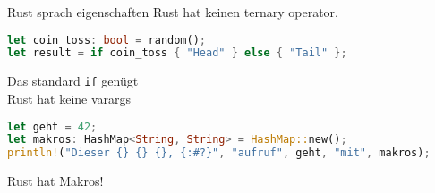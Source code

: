 \begin{frame}[fragile]{Rust sprach eigenschaften}
    Rust hat keinen ternary operator.
    \pause
    \begin{lstlisting}[language=Rust,escapechar=@,label={lst:ternary}]
let coin_toss: bool = random();
let result = if coin_toss { "Head" } else { "Tail" };
    \end{lstlisting}
    Das standard \texttt{if} genügt \\
    \pause
    \vspace{0.5cm}
    Rust hat keine varargs
    \pause
    \begin{lstlisting}[language=Rust,escapechar=@,label={lst:makros}]
let geht = 42;
let makros: HashMap<String, String> = HashMap::new();
println!("Dieser {} {} {}, {:#?}", "aufruf", geht, "mit", makros);
    \end{lstlisting}
    \pause
    Rust hat Makros!
\end{frame}
